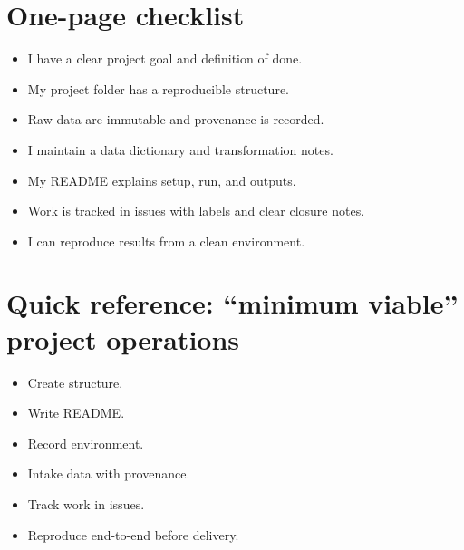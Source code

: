 \section{One-page checklist}
\begin{itemize}
\item I have a clear project goal and definition of done.
\item My project folder has a reproducible structure.
\item Raw data are immutable and provenance is recorded.
\item I maintain a data dictionary and transformation notes.
\item My README explains setup, run, and outputs.
\item Work is tracked in issues with labels and clear closure notes.
\item I can reproduce results from a clean environment.
\end{itemize}

\section{Quick reference: ``minimum viable'' project operations}
\begin{itemize}
\item Create structure.
\item Write README.
\item Record environment.
\item Intake data with provenance.
\item Track work in issues.
\item Reproduce end-to-end before delivery.
\end{itemize}
